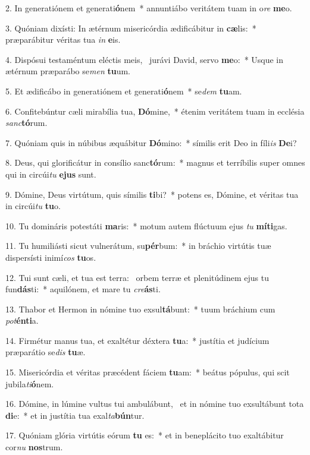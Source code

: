 2. In generatiónem et generati\textbf{ó}nem~*  annuntiábo veritátem tuam in o\textit{re} \textbf{me}o.\

3. Quóniam dixísti: In ætérnum misericórdia ædificábitur in \textbf{cæ}lis:~*  præparábitur véritas tua \textit{in} \textbf{e}is.\

4. Dispósui testaméntum eléctis meis, \dag\  jurávi David, servo \textbf{me}o:~*  Usque in ætérnum præparábo se\textit{men} \textbf{tu}um.\

5. Et ædificábo in generatiónem et generati\textbf{ó}nem~*  se\textit{dem} \textbf{tu}am.\

6. Confitebúntur cæli mirabília tua, \textbf{Dó}mine,~*  étenim veritátem tuam in ecclésia \textit{sanc}\textbf{tó}rum.\

7. Quóniam quis in núbibus æquábitur \textbf{Dó}mino:~*  símilis erit Deo in fíli\textit{is} \textbf{De}i?\

8. Deus, qui glorificátur in consílio sanc\textbf{tó}rum:~*  magnus et terríbilis super omnes qui in circúi\textit{tu} \textbf{e}\textbf{jus} sunt.\

9. Dómine, Deus virtútum, quis símilis \textbf{ti}bi?~*  potens es, Dómine, et véritas tua in circúi\textit{tu} \textbf{tu}o.\

10. Tu domináris potestáti \textbf{ma}ris:~*  motum autem flúctuum ejus \textit{tu} \textbf{mí}\textbf{ti}gas.\

11. Tu humiliásti sicut vulnerátum, su\textbf{pér}bum:~*  in bráchio virtútis tuæ dispersísti inimí\textit{cos} \textbf{tu}os.\

12. Tui sunt cæli, et tua est terra: \dag\  orbem terræ et plenitúdinem ejus tu fun\textbf{dás}ti:~*  aquilónem, et mare tu \textit{cre}\textbf{ás}ti.\

13. Thabor et Hermon in nómine tuo exsul\textbf{tá}bunt:~*  tuum bráchium cum \textit{pot}\textbf{én}\textbf{ti}a.\

14. Firmétur manus tua, et exaltétur déxtera \textbf{tu}a:~*  justítia et judícium præparátio se\textit{dis} \textbf{tu}æ.\

15. Misericórdia et véritas præcédent fáciem \textbf{tu}am:~*  beátus pópulus, qui scit jubila\textit{ti}\textbf{ó}nem.\

16. Dómine, in lúmine vultus tui ambulábunt, \dag\  et in nómine tuo exsultábunt tota \textbf{di}e:~*  et in justítia tua exal\textit{ta}\textbf{bún}tur.\

17. Quóniam glória virtútis eórum \textbf{tu} es:~*  et in beneplácito tuo exaltábitur cor\textit{nu} \textbf{nos}trum.\

